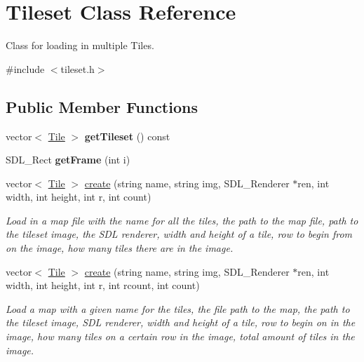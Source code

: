 \hypertarget{classTileset}{}\section{Tileset Class Reference}
\label{classTileset}


Class for loading in multiple Tiles.  




{\ttfamily \#include $<$tileset.\+h$>$}

\subsection*{Public Member Functions}
\begin{DoxyCompactItemize}
\item 
\mbox{\label{classTileset_a4944dd5a91fbae5ccb12230ee89c5213}} 
vector$<$ \hyperlink{classTile}{Tile} $>$ {\bfseries get\+Tileset} () const
\item 
\mbox{\label{classTileset_aefa962edb9c573aca7327387ba6be0b1}} 
S\+D\+L\+\_\+\+Rect {\bfseries get\+Frame} (int i)
\item 
\mbox{\label{classTileset_ad11cd044d9a2907003fee3baacba86e7}} 
vector$<$ \hyperlink{classTile}{Tile} $>$ \hyperlink{classTileset_ad11cd044d9a2907003fee3baacba86e7}{create} (string name, string img, S\+D\+L\+\_\+\+Renderer $\ast$ren, int width, int height, int r, int count)
\begin{DoxyCompactList}\small\item\em Load in a map file with the name for all the tiles, the path to the map file, path to the tileset image, the S\+DL renderer, width and height of a tile, row to begin from on the image, how many tiles there are in the image. \end{DoxyCompactList}\item 
\mbox{\label{classTileset_a1435c7ce70c5aa6da6388762971917aa}} 
vector$<$ \hyperlink{classTile}{Tile} $>$ \hyperlink{classTileset_a1435c7ce70c5aa6da6388762971917aa}{create} (string name, string img, S\+D\+L\+\_\+\+Renderer $\ast$ren, int width, int height, int r, int rcount, int count)
\begin{DoxyCompactList}\small\item\em Load a map with a given name for the tiles, the file path to the map, the path to the tileset image, S\+DL renderer, width and height of a tile, row to begin on in the image, how many tiles on a certain row in the image, total amount of tiles in the image. \end{DoxyCompactList}\item 

\end{DoxyCompactItemize}
